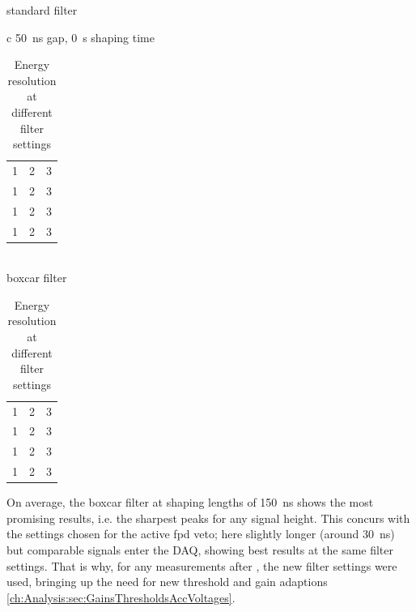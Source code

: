   \begin{table}
	\caption{Energy resolution at different filter settings}
	\centering
	standard filter
	\begin{tabular}{c}
	\SI{50}{\nano\second} gap, \SI{0}{\second} shaping time\\
	
  	\begin{tabular}{ccc}
  		1& 2& 3\\
  		1& 2& 3\\
  		1& 2& 3\\
  		1& 2& 3\\
  	\end{tabular}
  	\end{tabular}\\
  	boxcar filter
  	\begin{tabular}{ccc}
  		1& 2& 3\\
  		1& 2& 3\\
  		1& 2& 3\\
  		1& 2& 3\\
  	\end{tabular}

  \end{table}
  On average, the boxcar filter at shaping lengths of \SI{150}{\nano\second} shows the most promising results, i.e. the sharpest peaks for any signal height. This concurs with the settings chosen for the active fpd veto; here slightly longer (around \SI{30}{\nano\second}) but comparable signals enter the DAQ, showing best results at the same filter settings\cite{KevinWierman}.
  That is why, for any measurements after , the new filter settings were used, bringing up the need for new threshold and gain adaptions \ref{ch:Analysis:sec:GainsThresholdsAccVoltages}. 
  
